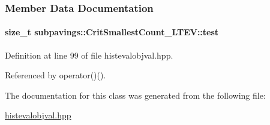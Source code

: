 \subsubsection{\-Member \-Data \-Documentation}
\hypertarget{classsubpavings_1_1CritSmallestCount__LTEV_aee3cca6ae148635a8377362170ca8d91}{
\paragraph[{test}]{\setlength{\rightskip}{0pt plus 5cm}size\-\_\-t {\bf subpavings\-::\-Crit\-Smallest\-Count\-\_\-\-L\-T\-E\-V\-::test}}}\label{classsubpavings_1_1CritSmallestCount__LTEV_aee3cca6ae148635a8377362170ca8d91}


\-Definition at line 99 of file histevalobjval.\-hpp.



\-Referenced by operator()().



\-The documentation for this class was generated from the following file\-:\begin{DoxyCompactItemize}
\item 
\hyperlink{histevalobjval_8hpp}{histevalobjval.\-hpp}\end{DoxyCompactItemize}
